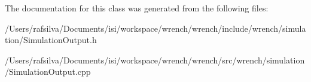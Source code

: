 The documentation for this class was generated from the following files\+:\begin{DoxyCompactItemize}
\item 
/\+Users/rafsilva/\+Documents/isi/workspace/wrench/wrench/include/wrench/simulation/Simulation\+Output.\+h\item 
/\+Users/rafsilva/\+Documents/isi/workspace/wrench/wrench/src/wrench/simulation/Simulation\+Output.\+cpp\end{DoxyCompactItemize}
